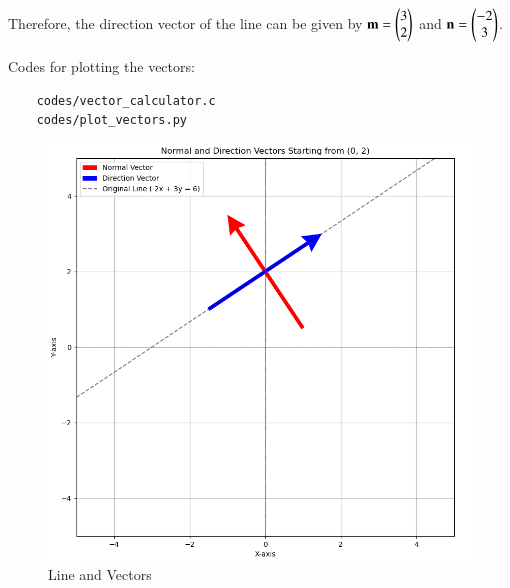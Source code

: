 \documentclass[journal]{IEEEtran}
\begin{document}
Therefore, the direction vector of the line can be given by $\mathbf{m} = \begin{pmatrix}3 \\ 2\end{pmatrix}$ and $\mathbf{n} = \begin{pmatrix}-2 \\ 3\end{pmatrix}$.

Codes for plotting the vectors:
\begin{lstlisting}
	codes/vector_calculator.c
	codes/plot_vectors.py
\end{lstlisting}

\begin{figure}[H]
    \centering
    \includegraphics[width=0.7\columnwidth]{figs/Figure_1.png}
    \caption{Line and Vectors}
    \label{4-4.2-3-fig-0}
\end{figure}
\end{document}
